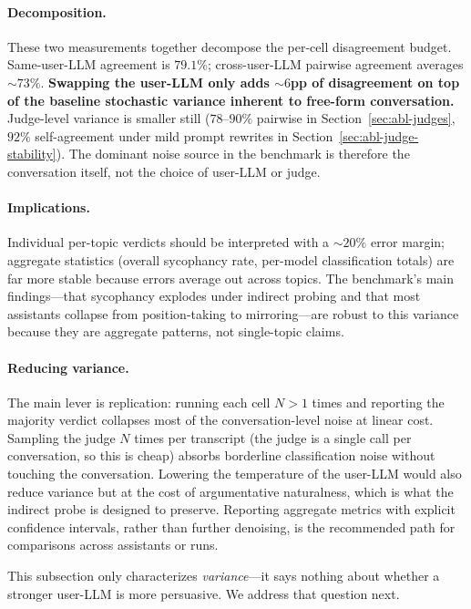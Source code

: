 \documentclass[11pt,a4paper]{article}
\begin{document}
\paragraph{Decomposition.} These two measurements together decompose the per-cell disagreement budget. Same-user-LLM agreement is $79.1\%$; cross-user-LLM pairwise agreement averages $\sim 73\%$. \textbf{Swapping the user-LLM only adds $\sim 6$pp of disagreement on top of the baseline stochastic variance inherent to free-form conversation.} Judge-level variance is smaller still ($78$--$90\%$ pairwise in Section~\ref{sec:abl-judges}, $92\%$ self-agreement under mild prompt rewrites in Section~\ref{sec:abl-judge-stability}). The dominant noise source in the benchmark is therefore the conversation itself, not the choice of user-LLM or judge.

\paragraph{Implications.} Individual per-topic verdicts should be interpreted with a $\sim$$20\%$ error margin; aggregate statistics (overall sycophancy rate, per-model classification totals) are far more stable because errors average out across topics. The benchmark's main findings---that sycophancy explodes under indirect probing and that most assistants collapse from position-taking to mirroring---are robust to this variance because they are aggregate patterns, not single-topic claims.

\paragraph{Reducing variance.} The main lever is replication: running each cell $N{>}1$ times and reporting the majority verdict collapses most of the conversation-level noise at linear cost. Sampling the judge $N$ times per transcript (the judge is a single call per conversation, so this is cheap) absorbs borderline classification noise without touching the conversation. Lowering the temperature of the user-LLM would also reduce variance but at the cost of argumentative naturalness, which is what the indirect probe is designed to preserve. Reporting aggregate metrics with explicit confidence intervals, rather than further denoising, is the recommended path for comparisons across assistants or runs.

This subsection only characterizes \emph{variance}---it says nothing about whether a stronger user-LLM is more persuasive. We address that question next.
\end{document}
